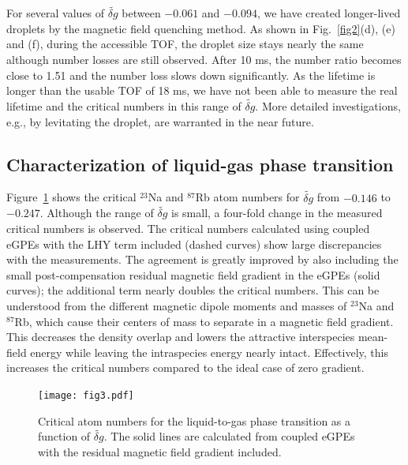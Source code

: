 For several values of $\widetilde{\delta g}$ between $-0.061$ and $-0.094$, we have created longer-lived droplets by the magnetic field quenching method. As shown in Fig.~\ref{fig2}(d), (e) and (f), during the accessible TOF, the droplet size stays nearly the same although number losses are still observed. After 10 ms, the number ratio becomes close to 1.51 and the number loss slows down significantly. As the lifetime is longer than the usable TOF of 18 ms, we have not been able to measure the real lifetime and the critical numbers in this range of $\widetilde{\delta g}$. More detailed investigations, e.g., by levitating the droplet, are warranted in the near future.

\subsection{Characterization of liquid-gas phase transition}

Figure~\ref{fig3} shows the critical $^{23}$Na and $^{87}$Rb atom numbers for $\widetilde{\delta g}$ from $-0.146$ to $-0.247$. Although the range of $\widetilde{\delta g}$ is small, a four-fold change in the measured critical numbers is observed. The critical numbers calculated using coupled eGPEs with the LHY term included (dashed curves) show large discrepancies with the measurements. The agreement is greatly improved by also including the small post-compensation residual magnetic field gradient in the eGPEs (solid curves); the additional term nearly doubles  the critical numbers. This can be understood from the different magnetic dipole moments and masses of $^{23}$Na and $^{87}$Rb, which cause their centers of mass to separate in a magnetic field gradient. This decreases the density overlap and lowers the attractive interspecies mean-field energy while leaving the intraspecies energy nearly intact. Effectively, this increases the critical numbers compared to the ideal case of zero gradient.

\begin{figure}[htb]
\begin{center}
\texttt{[image: fig3.pdf]}
\end{center}
\caption[Critical atom numbers for the liquid-to-gas phase transition as a function of $\widetilde{\delta g}$]{Critical atom numbers for the liquid-to-gas phase transition as a function of $\widetilde{\delta g}$. The solid lines are calculated from coupled eGPEs with the residual magnetic field gradient included.}
\label{fig3}
\end{figure}

